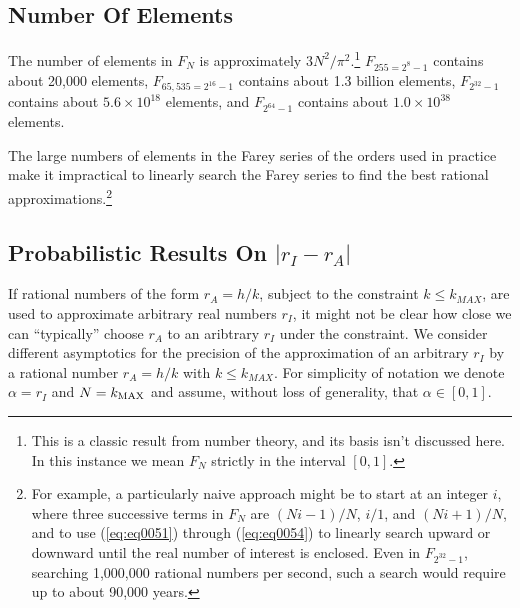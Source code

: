 \documentclass{esub2acm}
\begin{document}
\subsection{Number Of Elements}
\label{subsec:numberofelements}

The number of elements in $F_N$ is approximately
$3 N^2 / \pi{}^2$.\footnote{This is a classic result
from number theory, and its basis isn't discussed here.  In this
instance we mean $F_N$ strictly
in the interval $[0,1]$.}
$F_{255=2^8-1}$ contains about 20,000 elements,
$F_{65,535=2^{16}-1}$ contains about 1.3 billion elements,
$F_{2^{32}-1}$ contains about $5.6 \times 10^{18}$
elements, and $F_{2^{64}-1}$ contains about
$1.0 \times 10^{38}$ elements.

The large numbers of elements in the Farey
series of the orders used in practice make it impractical
to linearly search the Farey series to find the best rational
approximations.\footnote{For example, a particularly naive approach might
be to start at an integer $i$, where three successive terms
in $F_N$ are $(Ni-1)/N$, $i/1$, and $(Ni+1)/N$, and to use
(\ref{eq:eq0051}) through (\ref{eq:eq0054})
to linearly search upward or downward until the
real number of interest is enclosed.  Even in
$F_{2^{32}-1}$, searching 1,000,000 rational numbers per
second, such a search would require up to about 90,000 years.}


\subsection{Probabilistic Results On $| r_I - r_A |$}
\label{subsec:probresults}

If rational numbers of the form $r_A = h/k$, subject to the constraint
$k \leq k_{MAX}$, are used to approximate arbitrary real numbers
$r_I$, it might not be clear how close we can ``typically'' choose
$r_A$ to an aribtrary $r_I$ under the constraint.
We consider different asymptotics for
the precision of the approximation of an arbitrary $r_I$ by a
rational number
$r_A=h/k$ with $k \leq k_{MAX}$. For simplicity of notation
we
denote $\alpha= r_I$ and $N=k_{ \rm MAX }$ and assume, without
loss of generality, that
$ \alpha \in [0,1]$.
\end{document}
